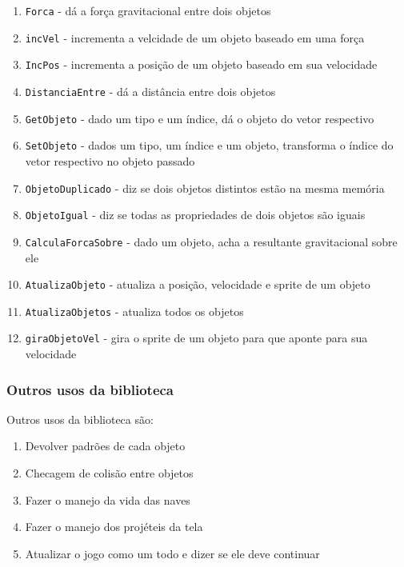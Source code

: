 \documentclass[12pt, a4paper]{article}
\begin{document}
    \begin{enumerate}
        \item \texttt{Forca} - dá a força gravitacional entre dois objetos
        \item \texttt{incVel} - incrementa a velcidade de um objeto baseado em uma força
        \item \texttt{IncPos} - incrementa a posição de um objeto baseado em sua velocidade
        \item \texttt{DistanciaEntre} - dá a distância entre dois objetos
        \item \texttt{GetObjeto} - dado um tipo e um índice, dá o objeto do vetor respectivo
        \item \texttt{SetObjeto} - dados um tipo, um índice e um objeto, transforma
        o índice do vetor respectivo no objeto passado
        \item \texttt{ObjetoDuplicado} - diz se dois objetos distintos estão na mesma memória
        \item \texttt{ObjetoIgual} - diz se todas as propriedades de dois objetos são iguais
        \item \texttt{CalculaForcaSobre} - dado um objeto, acha a resultante gravitacional sobre ele
        \item \texttt{AtualizaObjeto} - atualiza a posição, velocidade e sprite de um objeto
        \item \texttt{AtualizaObjetos} - atualiza todos os objetos
        \item \texttt{giraObjetoVel} - gira o sprite de um objeto para que aponte para sua velocidade
    \end{enumerate}

    \subsubsection{Outros usos da biblioteca}

    Outros usos da biblioteca são:
    \begin{enumerate}
        \item Devolver padrões de cada objeto
        \item Checagem de colisão entre objetos
        \item Fazer o manejo da vida das naves
        \item Fazer o manejo dos projéteis da tela
        \item Atualizar o jogo como um todo e dizer se ele deve continuar
    \end{enumerate}
\end{document}
